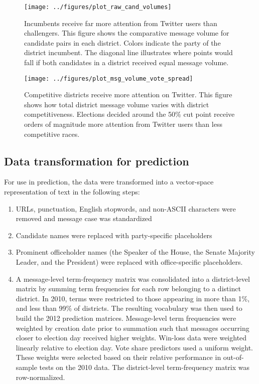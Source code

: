 \documentclass{article}
\begin{document}
\begin{figure}[ht]
  \centering
  \texttt{[image: ../figures/plot\_raw\_cand\_volumes]}
  \caption{Incumbents receive far more attention from Twitter users
    than challengers. This figure shows the comparative message volume for
    candidate pairs in each district. Colors indicate the party of the
    district incumbent. The diagonal line illustrates where points would fall if both candidates in a district received equal message volume.}
  \label{fig:cand-msg-volume}
\end{figure}

\begin{figure}[ht]
  \centering
  \texttt{[image: ../figures/plot\_msg\_volume\_vote\_spread]}
  \caption{Competitive districts receive more attention on
    Twitter. This figure shows how total district message volume
    varies with district competitiveness. Elections decided around the
  50\% cut point receive orders of magnitude more attention from
  Twitter users than less competitive races.}
  \label{fig:msg-volume-vote-spread}
\end{figure}



\subsection{Data transformation for prediction}
\label{sec:data-transf-pred}

For use in prediction, the data were transformed into a vector-space
representation of text in the following steps:
\begin{enumerate}
\item URLs, punctuation, English stopwords, and non-ASCII characters were removed and
  message case was standardized
\item Candidate names were replaced with party-specific placeholders
\item Prominent officeholder names (the Speaker of the House, the Senate
  Majority Leader, and the President) were replaced with
  office-specific placeholders. 
\item A message-level term-frequency matrix
  was consolidated into a district-level matrix by summing term
  frequencies for each row belonging to a distinct district. In 2010,
  terms were restricted to those appearing in more than 1\%, and less
  than 99\% of districts. The resulting vocabulary was then used to build
  the 2012 prediction matrices. Message-level term frequencies were
  weighted by creation date prior to summation such that messages
  occurring closer to election day received higher weights. Win-loss data were
   weighted linearly relative to election
  day. Vote share 
  predictors used a uniform weight. These weights were
  selected based on their relative performance in out-of-sample tests
  on the 2010 data. The district-level term-frequency matrix was row-normalized.
\end{enumerate}
\end{document}
